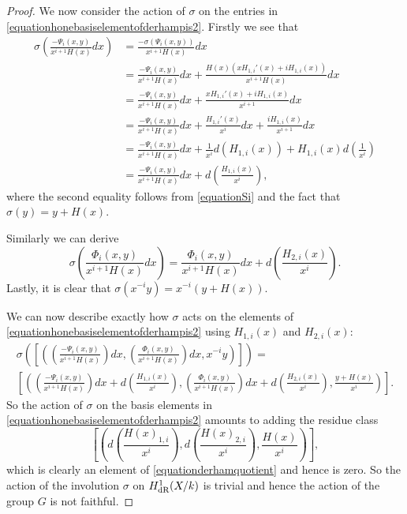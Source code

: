 \begin{proof}
    We now consider the action of $\sigma$ on the entries in \eqref{equationhonebasiselementofderhampis2}.
    Firstly we see that
        \begin{align*}
        \sigma \left( \frac{-\Psi_i(x,y)}{x^{i+1}H(x)} dx\right) & = \frac{-\sigma(\Psi_i(x,y))}{x^{i+1} H(x)} dx \\
        & = \frac{-\Psi_i(x,y)}{x^{i+1}H(x)}dx + \frac{H(x)(xH_{1,i}'(x) + iH_{1,i}(x))}{x^{i+1}H(x)}dx\\
        & = \frac{-\Psi_i(x,y)}{x^{i+1}H(x)}dx + \frac{xH_{1,i}'(x) + iH_{1,i}(x)}{x^{i+1}}dx \\
        & = \frac{-\Psi_i(x,y)}{x^{i+1}H(x)}dx +  \frac{H_{1,i}'(x)}{x^i}dx + \frac{iH_{1,i}(x)}{x^{i+1}}dx \\
        & = \frac{-\Psi_i(x,y)}{x^{i+1}H(x)}dx +  \frac{1}{x^i}d\left( H_{1,i}(x) \right) + H_{1,i}(x) d \left( \frac{1}{x^i} \right) \\
        & = \frac{-\Psi_i(x,y)}{x^{i+1}H(x)}dx + d\left( \frac{H_{1,i}(x)}{x^i} \right),
        \end{align*}
    where the second equality follows from \eqref{equationSi} and the fact that $\sigma(y) = y + H(x)$.
    
    Similarly we can derive
        \begin{equation*}
        \sigma \left( \frac{\Phi_i(x,y)}{x^{i+1}H(x)} dx \right)  = \frac{\Phi_i(x,y)}{x^{i+1}H(x)} dx + d \left( \frac{H_{2,i}(x)}{x^i} \right).
        \end{equation*}
    Lastly, it is clear that $\sigma(x^{-i}y) = x^{-i}(y+H(x))$.
    
    
    We can now describe exactly how $\sigma$ acts on the elements of \eqref{equationhonebasiselementofderhampis2} using $H_{1,i}(x)$ and $H_{2,i}(x)$:
        \begin{multline*}
        \sigma \left( \left[ \left( \left(\frac{-\Psi_i(x,y)}{x^{i+1}H(x)}\right) dx, \left( \frac{\Phi_i(x,y)}{x^{i+1}H(x)} \right) dx, x^{-i}y \right)\right]\right) = \\
         \left[ \left( \left(\frac{-\Psi_i(x,y)}{x^{i+1}H(x)} \right) dx + d\left(\frac{H_{1,i}(x)}{x^i}\right),  \left( \frac{\Phi_i(x,y)}{x^{i+1}H(x)} \right) dx+ d\left(\frac{H_{2,i}(x)}{x^i} \right), \frac{y+H(x)}{x^i} \right) \right].
        \end{multline*}
    So the action of $\sigma$ on the basis elements in \eqref{equationhonebasiselementofderhampis2} amounts to adding the residue class 
        \[
        \left[ \left( d\left(\frac{H(x)_{1,i}}{x^i}\right), d\left(\frac{H(x)_{2,i}}{x^i}\right), \frac{H(x)}{x^i} \right)\right],
        \]
    which is clearly an element of \eqref{equationderhamquotient} and hence is zero.
    So the action of the involution $\sigma$ on $H_{\text {dR}}^1(X/k)$ is trivial and hence the action of the group $G$ is not faithful.
    \end{proof}

